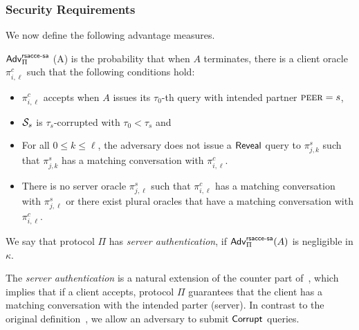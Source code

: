 \subsubsection{Security Requirements}
We now define the following advantage measures.

\begin{definition} \label{def:rsacce-sa}
 $\mathsf{Adv}^{\mathsf{rsacce\textsc{-} sa}}_{\Pi}$ (A) is the probability that when $A$ terminates, there is
 a client oracle $\pi^c_{i, \ell}$ such that the following conditions hold:
 \begin{itemize}
  \item{$\pi^c_{i, \ell}$ accepts when $A$ issues its $\tau_0$-th query with intended partner $\textsc{peer}=s$, }

  \item{$\mathcal{S}_s$ is $\tau_{s}$-corrupted with $\tau_0 < \tau_{s}$ and}

  \item{For all $0\leq k \leq \ell$, the adversary does not issue a $\mathsf{Reveal}$ query to $\pi^s_{j, k}$ such that $\pi^s_{j, k}$ has a matching conversation with $\pi^c_{i, \ell}$.}

  \item{There is no server oracle $\pi^s_{j, \ell}$ such that $\pi^c_{i,\ell}$ has a matching conversation
  with $\pi^s_{j,\ell}$ or there exist plural oracles that have a matching conversation with $\pi^c_{i,\ell}$.}
 \end{itemize}
 We say that protocol $\Pi$ has \textit{server authentication}, if
 $\mathsf{Adv}^{\mathsf{rsacce\textsc{-} sa}}_{\Pi}(A)$ is negligible in $\kappa$.
\end{definition}

\begin{remark}
 The \textit{server authentication}  is a natural extension of the counter part of~\cite{KPW13:SACCE},
 which implies that if a client accepts, protocol $\Pi$ guarantees that the client has a matching conversation with
 the intended parter (server). In contrast to the original definition~\cite{KPW13:SACCE},
 we allow an adversary to submit $\mathsf{Corrupt}$ queries.
 \end{remark}

